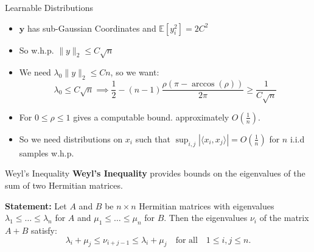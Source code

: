 \documentclass[serif, aspectratio=169]{beamer}
\newcommand{\E}{\mathbb{E}}
\begin{document}
\begin{frame}{Learnable Distributions}
	\begin{itemize}
		\item \(\mathbf{y}\) has sub-Gaussian Coordinates and \(\E[y_i^2] = 2C^2\)
		\item So w.h.p. \(\|y\|_2 \leq C\sqrt{n}\)
		\item We need \(\lambda_0 \|y\|_2 \leq Cn\), so we want:
		\[
		\lambda_0 \leq C\sqrt{n} \implies  \frac{1}{2} - (n-1)\frac{\rho(\pi-\arccos(\rho))}{2\pi} \geq \frac{1}{C\sqrt{n}}
		\]
		\item For \(0 \leq \rho \leq 1\) gives a computable bound. approximately \(O(\frac{1}{n})\).
		\item So we need distributions on \(x_i\) such that \(\sup_{i,j}|\langle x_i, x_j \rangle| = O(\frac{1}{n})\) for \(n\) i.i.d samples w.h.p.
	\end{itemize}
\end{frame}


%
%
%
%

\begin{frame}{Weyl's Inequality}
    \textbf{Weyl's Inequality} provides bounds on the eigenvalues of the sum of two Hermitian matrices.

    \vspace{0.5cm}
    
    \textbf{Statement:} Let \( A \) and \( B \) be \( n \times n \) Hermitian matrices with eigenvalues \( \lambda_1 \leq \dots \leq \lambda_n \) for \( A \) and \( \mu_1 \leq \dots \leq \mu_n \) for \( B \). Then the eigenvalues \( \nu_i \) of the matrix \( A + B \) satisfy:
    \[
    \lambda_i + \mu_j \leq \nu_{i+j-1} \leq \lambda_i + \mu_j \quad \text{for all} \quad 1 \leq i,j \leq n.
    \]
\end{frame}
\end{document}
